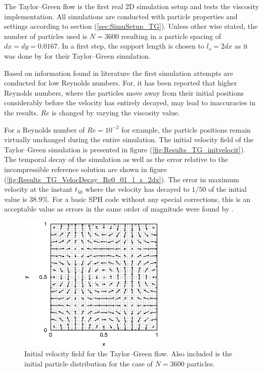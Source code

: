 \documentclass{report}
\begin{document}
The Taylor--Green flow is the first real 2D simulation setup and tests the viscosity implementation. All simulations are conducted with particle properties and settings according to section (\ref{sec:SimuSetup_TG}). Unless other wise stated, the number of particles used is $N=3600$ resulting in a particle spacing of $dx=dy=0.0167$. In a first step, the support length is chosen to $l_s=2dx$ as it was done by \cite{Hu2007} for their Taylor--Green simulation. %

Based on information found in literature \cite{Chaniotis2002, Ellero2007} the first simulation attempts are conducted for low Reynolds numbers. For, it has been reported that higher Reynolds numbers, where the particles move away from their initial positions considerably before the velocity has entirely decayed, may lead to inaccuracies in the results. $Re$ is changed by varying the viscosity value.

For a  Reynolds number of $Re=10^{-2}$ for example, the particle positions remain virtually unchanged during the entire simulation. The initial velocity field of the Taylor--Green simulation is presented in figure (\ref{fig:Results_TG_initvelocit}). The temporal decay of the simulation as well as the error relative to the incompressible reference solution are shown in figure (\ref{fig:Results_TG_VelocDecay_Re0_01_l_s_2dx}). The error in maximum velocity at the instant $t_{50}$  where the velocity has decayed to $1/50$ of the initial value is $38.9\%$. For a basic SPH code without any special corrections, this is an acceptable value as errors in the same order of magnitude were found by \cite{Hu2007}.

\begin{figure}[h]
 \label{fig:Results_TG_initvelocity}
\centering
\includegraphics[width=7cm]{Graphics/results/TaylorGreen/N3600_eta_100_suplen2dx/InitVeloc}
\caption[Velocity field Taylor--Green]{Initial velocity field for the Taylor--Green flow. Also included is the initial particle distribution for the case of $N=3600$ particles.}
\end{figure}
\end{document}
